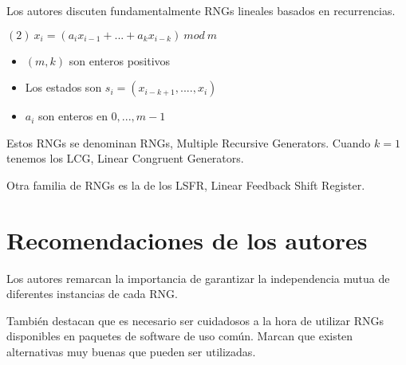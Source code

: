 \documentclass[11pt]{article}
\begin{document}
Los autores discuten fundamentalmente RNGs lineales basados en recurrencias.

$(2)\: x_i = (a_i x_{i-1} + ... + a_k x_{i-k}) \: mod \: m$

\begin{itemize}
	\item $(m,k)$ son enteros positivos
	\item Los estados son $s_i = (x_{i-k+1}, ...., x_i)$
	\item $a_i$ son enteros en ${0, ..., m-1}$
\end{itemize}

Estos RNGs se denominan RNGs, Multiple Recursive Generators. Cuando $k=1$ tenemos los LCG, Linear Congruent Generators.

Otra familia de RNGs es la de los LSFR, Linear Feedback Shift Register.

\section{Recomendaciones de los autores}

Los autores remarcan la importancia de garantizar la independencia mutua de diferentes instancias de cada RNG. 

También destacan que es necesario ser cuidadosos a la hora de utilizar RNGs disponibles en paquetes de software de uso común. Marcan que existen alternativas muy buenas que pueden ser utilizadas.
\end{document}
